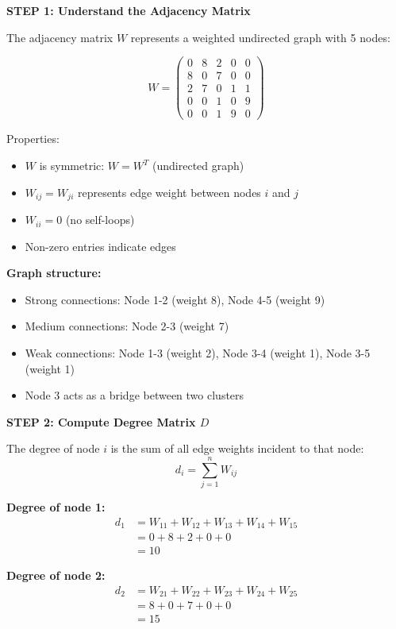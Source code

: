 \documentclass[12pt]{article}
\begin{document}
\begin{solution}

\textbf{STEP 1: Understand the Adjacency Matrix}

The adjacency matrix $W$ represents a weighted undirected graph with 5 nodes:

\[
W = \begin{pmatrix}
0 & 8 & 2 & 0 & 0 \\
8 & 0 & 7 & 0 & 0 \\
2 & 7 & 0 & 1 & 1 \\
0 & 0 & 1 & 0 & 9 \\
0 & 0 & 1 & 9 & 0
\end{pmatrix}
\]

Properties:
\begin{itemize}
    \item $W$ is symmetric: $W = W^T$ (undirected graph)
    \item $W_{ij} = W_{ji}$ represents edge weight between nodes $i$ and $j$
    \item $W_{ii} = 0$ (no self-loops)
    \item Non-zero entries indicate edges
\end{itemize}

\textbf{Graph structure:}
\begin{itemize}
    \item Strong connections: Node 1-2 (weight 8), Node 4-5 (weight 9)
    \item Medium connections: Node 2-3 (weight 7)
    \item Weak connections: Node 1-3 (weight 2), Node 3-4 (weight 1), Node 3-5 (weight 1)
    \item Node 3 acts as a bridge between two clusters
\end{itemize}

\textbf{STEP 2: Compute Degree Matrix $D$}

The degree of node $i$ is the sum of all edge weights incident to that node:
\[
d_i = \sum_{j=1}^{n} W_{ij}
\]

\textbf{Degree of node 1:}
\begin{align*}
d_1 &= W_{11} + W_{12} + W_{13} + W_{14} + W_{15} \\
&= 0 + 8 + 2 + 0 + 0 \\
&= 10
\end{align*}

\textbf{Degree of node 2:}
\begin{align*}
d_2 &= W_{21} + W_{22} + W_{23} + W_{24} + W_{25} \\
&= 8 + 0 + 7 + 0 + 0 \\
&= 15
\end{align*}


\end{solution}
\end{document}
